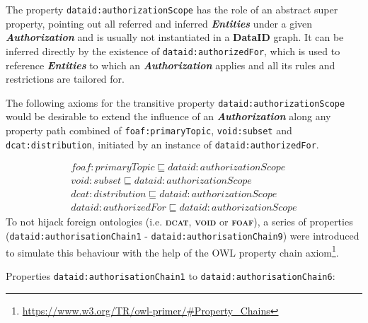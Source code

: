 \documentclass[a4paper,english,twoside,BCOR1.5cm,headsepline,DIV12,appendixprefix,final,12pt]{scrbook}
\newcommand{\dataid}{{\ttfamily\bfseries DataID}\xspace}
\newcommand{\void}{{\scshape\bfseries void}\xspace}
\newcommand{\dcat}{{\scshape\bfseries dcat}\xspace}
\newcommand{\foaf}{{\scshape\bfseries foaf}\xspace}
\newcommand{\prop}[1]{{{\texttt{#1}}}}
\newcommand{\important}[1]{\textbf{\textit{#1}}}
\newcommand\footnoteurl[1]{\footnote{\scriptsize\url{#1}}}
\begin{document}
The property \prop{dataid:authorizationScope} has the role of an abstract super property, pointing out all referred and inferred \important{Entities} under a given \important{Authorization} and is usually not instantiated in a \dataid graph. It can be inferred directly by the existence of  \prop{dataid:authorizedFor}, which is used to reference \important{Entities} to which an \important{Authorization} applies and all its rules and restrictions are tailored for.

The following axioms for the transitive property \prop{dataid:authorizationScope} would be desirable to extend the influence of an \important{Authorization} along any property path combined of \prop{foaf:primaryTopic}, \prop{void:subset} and \prop{dcat:distribution}, initiated by an instance of \prop{dataid:authorizedFor}.

{\footnotesize
\vspace*{-0.5cm}
\begin{align*}
foaf:primaryTopic \sqsubseteq dataid:authorizationScope\\
void:subset \sqsubseteq dataid:authorizationScope\\
dcat:distribution \sqsubseteq dataid:authorizationScope\\
dataid:authorizedFor \sqsubseteq dataid:authorizationScope
\end{align*}
}%
To not hijack foreign ontologies \cite{feeney2015linked} (i.e. \dcat, \void or \foaf), a series of properties (\prop{dataid:authorisationChain1} - \prop{dataid:authorisationChain9}) were introduced to simulate this behaviour with the help of the OWL property chain axiom\footnoteurl{https://www.w3.org/TR/owl-primer/#Property_Chains}.

Properties \prop{dataid:authorisationChain1} to \prop{dataid:authorisationChain6}:
\end{document}
